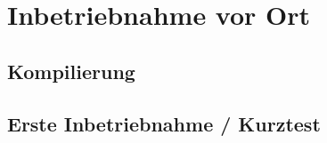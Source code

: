 \section{Inbetriebnahme vor Ort}

\subsection{Kompilierung}

\subsection{Erste Inbetriebnahme / Kurztest}